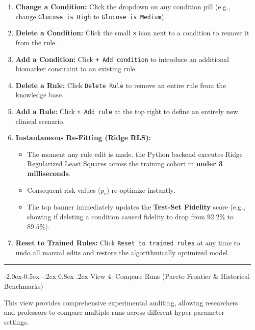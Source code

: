 \documentclass[10pt,a4paper]{article}
\makeatletter
\renewcommand\subsubsection{\@startsection{subsubsection}{3}{\z@}%
                                     {-2.0ex\@plus -0.5ex \@minus -.2ex}%
                                     {0.8ex \@plus .2ex}%
                                     {\normalfont\normalsize\bfseries\color{accent}}}
\providecommand{\tightlist}{\setlength{\itemsep}{1pt}\setlength{\parskip}{1pt}}
\makeatother
\begin{document}
\begin{enumerate}
\def\labelenumi{\arabic{enumi}.}
\tightlist
\item
  \textbf{Change a Condition:} Click the dropdown on any condition pill
  (e.g., change \texttt{Glucose\ is\ High} to
  \texttt{Glucose\ is\ Medium}).
\item
  \textbf{Delete a Condition:} Click the small \texttt{×} icon next to a
  condition to remove it from the rule.
\item
  \textbf{Add a Condition:} Click \texttt{+\ Add\ condition} to
  introduce an additional biomarker constraint to an existing rule.
\item
  \textbf{Delete a Rule:} Click \texttt{Delete\ Rule} to remove an
  entire rule from the knowledge base.
\item
  \textbf{Add a Rule:} Click \texttt{+\ Add\ rule} at the top right to
  define an entirely new clinical scenario.
\item
  \textbf{Instantaneous Re-Fitting (Ridge RLS):}

  \begin{itemize}
  \tightlist
  \item
    The moment any rule edit is made, the Python backend executes Ridge
    Regularized Least Squares across the training cohort in
    \textbf{under 3 milliseconds}.
  \item
    Consequent risk values (\(p_r\)) re-optimize instantly.
  \item
    The top banner immediately updates the \textbf{Test-Set Fidelity}
    score (e.g., showing if deleting a condition caused fidelity to drop
    from \(92.2\%\) to \(89.5\%\)).
  \end{itemize}
\item
  \textbf{Reset to Trained Rules:} Click
  \texttt{Reset\ to\ trained\ rules} at any time to undo all manual
  edits and restore the algorithmically optimized model.
\end{enumerate}

\begin{center}\rule{0.5\linewidth}{0.5pt}\end{center}

\subsubsection{View 4: Compare Runs (Pareto Frontier \& Historical
Benchmarks)}\label{view-4-compare-runs-pareto-frontier-historical-benchmarks}

This view provides comprehensive experimental auditing, allowing
researchers and professors to compare multiple runs across different
hyper-parameter settings.
\end{document}
